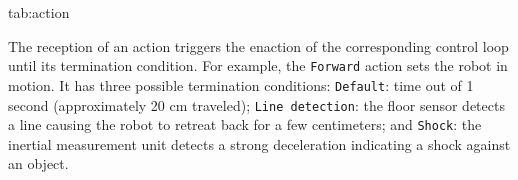 \documentclass[pmlr]{jmlr}%
\begin{document}
\begin{table}[htbp]
	\floatconts
	{tab:action}
	{\caption{Actions available to the robot and their possible outcomes}}
	{%
		\qquad
	}
\end{table}

The reception of an action triggers the enaction of the corresponding control loop until its termination condition.
For example, the \texttt{Forward} action sets the robot in motion. 
It has three possible termination conditions: 
\texttt{Default}: time out of 1 second (approximately 20 cm traveled);
\texttt{Line detection}: the floor sensor detects a line causing the robot to retreat back for a few centimeters; and
\texttt{Shock}: the inertial measurement unit detects a strong deceleration indicating a shock against an object.
\end{document}
